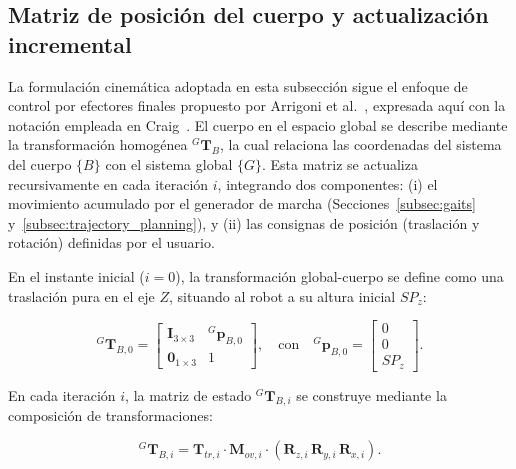 \subsection{Matriz de posición del cuerpo y actualización incremental}

La formulación cinemática adoptada en esta subsección sigue el enfoque de control por efectores finales propuesto por Arrigoni et al.~\cite{arrigoni2024control}, expresada aquí con la notación empleada en Craig~\cite{craig2018robotics}. El cuerpo en el espacio global se describe mediante la transformación homogénea ${}^{G}\mathbf{T}_B$, la cual relaciona las coordenadas del sistema del cuerpo $\{B\}$ con el sistema global $\{G\}$. Esta matriz se actualiza recursivamente en cada iteración $i$, integrando dos componentes: (i) el movimiento acumulado por el generador de marcha (Secciones~\ref{subsec:gaits} y~\ref{subsec:trajectory_planning}), y (ii) las consignas de posición (traslación y rotación) definidas por el usuario.

En el instante inicial ($i=0$), la transformación global-cuerpo se define como una traslación pura en el eje $Z$, situando al robot a su altura inicial $SP_z$:

\vspace{-0.5\baselineskip}
\begin{equation}
    {}^{G}\mathbf{T}_{B,0} =
    \begin{bmatrix}
        \mathbf{I}_{3\times 3} & {}^{G}\bm{p}_{B,0}\\
        \bm{0}_{1\times 3} & 1
    \end{bmatrix},
    \quad \text{con} \quad
    {}^{G}\bm{p}_{B,0} =
    \begin{bmatrix}
        0 \\ 0 \\ SP_z
    \end{bmatrix}.
    \label{eq:Tgb0}
\end{equation}
\vspace{-0.8\baselineskip}

En cada iteración $i$, la matriz de estado ${}^{G}\mathbf{T}_{B,i}$ se construye mediante la composición de transformaciones:

\vspace{-1\baselineskip}
\begin{equation}
    {}^{G}\mathbf{T}_{B,i}
    =
    \mathbf{T}_{tr,i} \cdot \mathbf{M}_{ov,i} \cdot \left( \mathbf{R}_{z,i}\,\mathbf{R}_{y,i}\,\mathbf{R}_{x,i} \right).
    \label{eq:Tgb_decomp_full}
\end{equation}

